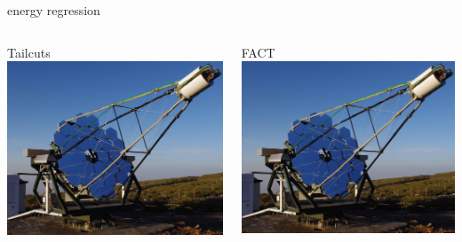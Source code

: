 \begin{frame}{energy regression}
    \begin{columns}[T] %
        \begin{column}{.48\textwidth}
            Tailcuts
            \includegraphics[width=\linewidth]{images/fact_telescope.jpg}
        \end{column}
        \begin{column}{.48\textwidth}
            FACT
            \includegraphics[width=\linewidth]{images/fact_telescope.jpg}
        \end{column}
    \end{columns}
\end{frame}

